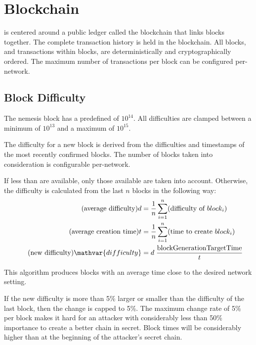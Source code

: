 \section{Blockchain}
\label{sec:blockchain}


\codenamespace is centered around a public ledger called the blockchain that links blocks together.
The complete transaction history is held in the blockchain.
All blocks, and transactions within blocks, are deterministically and cryptographically ordered.
The maximum number of transactions per block can be configured per-network.

\subsection{Block Difficulty}
\label{sec:blockchain:difficulty}

The nemesis block has a predefined  of $10^{14}$.
All difficulties are clamped between a minimum of $10^{13}$ and a maximum of $10^{15}$.

The difficulty for a new block is derived from the difficulties and timestamps of the most recently confirmed blocks.
The number of blocks taken into consideration is configurable per-network.

If less than  are available, only those available are taken into account.
Otherwise, the difficulty is calculated from the last $n$ blocks in the following way:
\begin{align*}
	\tag{average difficulty} d &= \frac{1}{n}\sum_{i=1}^n (\text{difficulty of $block_i$}) \\
	\tag{average creation time} t &= \frac{1}{n}\sum_{i=1}^n (\text{time to create $block_i$}) \\
	\tag{new difficulty} \mathvar{difficulty} &= d \; \frac{\nemsetting{network}{blockGenerationTargetTime}}{t}
\end{align*}

This algorithm produces blocks with an average time close to the desired  network setting.

If the new difficulty is more than 5\% larger or smaller than the difficulty of the last block, then the change is capped to 5\%.
The maximum change rate of 5\% per block makes it hard for an attacker with considerably less than 50\% importance to create a better chain in secret.
Block times will be considerably higher than  at the beginning of the attacker's secret chain.

